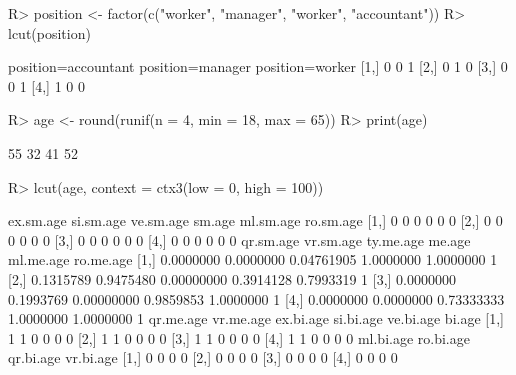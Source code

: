 \documentclass{article}\usepackage[]{graphicx}\usepackage[]{color}
\begin{document}
\begin{Schunk}
% --begin: "lcut.factor"
\begin{Sinput}
R> position <- factor(c("worker", "manager", "worker", "accountant"))
R> lcut(position)
\end{Sinput}
\begin{Soutput}
     position=accountant position=manager position=worker
[1,]                   0                0               1
[2,]                   0                1               0
[3,]                   0                0               1
[4,]                   1                0               0
\end{Soutput}
%
% --end: "lcut.factor"
\end{Schunk}

\begin{Schunk}
% --begin: "lcut.numeric"
\begin{Sinput}
R> age <- round(runif(n = 4, min = 18, max = 65))
R> print(age)
\end{Sinput}
\begin{Soutput}
[1] 55 32 41 52
\end{Soutput}
\begin{Sinput}
R> lcut(age, context = ctx3(low = 0, high = 100))
\end{Sinput}
\begin{Soutput}
     ex.sm.age si.sm.age ve.sm.age sm.age ml.sm.age ro.sm.age
[1,]         0         0         0      0         0         0
[2,]         0         0         0      0         0         0
[3,]         0         0         0      0         0         0
[4,]         0         0         0      0         0         0
     qr.sm.age vr.sm.age  ty.me.age    me.age ml.me.age ro.me.age
[1,] 0.0000000 0.0000000 0.04761905 1.0000000 1.0000000         1
[2,] 0.1315789 0.9475480 0.00000000 0.3914128 0.7993319         1
[3,] 0.0000000 0.1993769 0.00000000 0.9859853 1.0000000         1
[4,] 0.0000000 0.0000000 0.73333333 1.0000000 1.0000000         1
     qr.me.age vr.me.age ex.bi.age si.bi.age ve.bi.age bi.age
[1,]         1         1         0         0         0      0
[2,]         1         1         0         0         0      0
[3,]         1         1         0         0         0      0
[4,]         1         1         0         0         0      0
     ml.bi.age ro.bi.age qr.bi.age vr.bi.age
[1,]         0         0         0         0
[2,]         0         0         0         0
[3,]         0         0         0         0
[4,]         0         0         0         0
\end{Soutput}
%
% --end: "lcut.numeric"
\end{Schunk}
\end{document}

